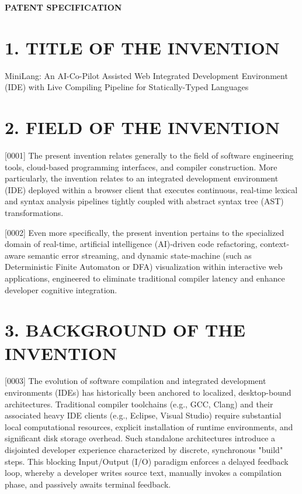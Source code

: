 \documentclass[12pt, a4paper]{article}
\begin{document}

\begin{center}
    \Large \textbf{PATENT SPECIFICATION}
\end{center}
\vspace{1em}

\section*{1. TITLE OF THE INVENTION}
MiniLang: An AI-Co-Pilot Assisted Web Integrated Development Environment (IDE) with Live Compiling Pipeline for Statically-Typed Languages

\section*{2. FIELD OF THE INVENTION}
[0001] The present invention relates generally to the field of software engineering tools, cloud-based programming interfaces, and compiler construction. More particularly, the invention relates to an integrated development environment (IDE) deployed within a browser client that executes continuous, real-time lexical and syntax analysis pipelines tightly coupled with abstract syntax tree (AST) transformations.

[0002] Even more specifically, the present invention pertains to the specialized domain of real-time, artificial intelligence (AI)-driven code refactoring, context-aware semantic error streaming, and dynamic state-machine (such as Deterministic Finite Automaton or DFA) visualization within interactive web applications, engineered to eliminate traditional compiler latency and enhance developer cognitive integration.

\section*{3. BACKGROUND OF THE INVENTION}
[0003] The evolution of software compilation and integrated development environments (IDEs) has historically been anchored to localized, desktop-bound architectures. Traditional compiler toolchains (e.g., GCC, Clang) and their associated heavy IDE clients (e.g., Eclipse, Visual Studio) require substantial local computational resources, explicit installation of runtime environments, and significant disk storage overhead. Such standalone architectures introduce a disjointed developer experience characterized by discrete, synchronous "build" steps. This blocking Input/Output (I/O) paradigm enforces a delayed feedback loop, whereby a developer writes source text, manually invokes a compilation phase, and passively awaits terminal feedback.
\end{document}
